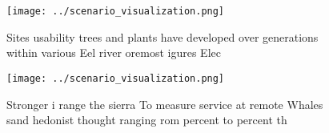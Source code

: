 \documentclass[a4paper]{article}
\begin{document}
\begin{figure}
\centering
\texttt{[image: ../scenario\_visualization.png]}
\caption{Sites usability trees and plants have developed over generations within various Eel river oremost igures Elec
}
\end{figure}
 
\begin{figure}
\centering
\texttt{[image: ../scenario\_visualization.png]}
\caption{Stronger i range the sierra To measure service at remote Whales sand hedonist thought ranging rom percent to percent th
}
\end{figure}
 
\end{document}
